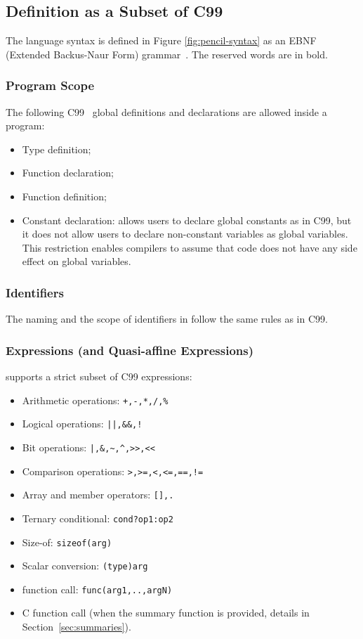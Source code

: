 \subsection{\pencil Definition as a Subset of C99}
\label{pencil-c99-subset}
The language syntax is defined in Figure \ref{fig:pencil-syntax} as an EBNF (Extended
Backus-Naur Form) grammar~\cite{wirth1996EBNF}.
The reserved words are in bold.



\subsubsection{Program Scope}
The following C99~\cite{c99} global definitions and declarations are allowed inside a
\pencil program:
\begin{itemize}
  \item Type definition;
  \item Function declaration;
  \item Function definition;
  \item Constant declaration: \pencil allows users to declare global constants
        as in C99, but it does not allow users to declare non-constant variables
        as global variables.
        This restriction enables \pencil compilers to
        assume that \pencil code does not have any side effect on global
        variables.
\end{itemize}

\subsubsection{Identifiers}
The naming and the scope of identifiers in \pencil follow the same rules as
in C99.

\subsubsection{Expressions (and Quasi-affine Expressions)}
\pencil supports a strict subset of C99 expressions:
\begin{itemize}
  \item Arithmetic operations: \lstinline!+,-,*,/,%!
  \item Logical operations: \lstinline{||,&&,!}
  \item Bit operations: \lstinline{|,&,~,^,>>,<<}
  \item Comparison operations: \lstinline{>,>=,<,<=,==,!=}
  \item Array and member operators: \lstinline{[],.}
  \item Ternary conditional: \lstinline!cond?op1:op2!
  \item Size-of: \lstinline!sizeof(arg)!
  \item Scalar conversion: \lstinline!(type)arg!
  \item \pencil function call: \lstinline!func(arg1,..,argN)!
  \item C function call (when the summary function is provided,
  details in Section~\ref{sec:summaries}).
\end{itemize}



